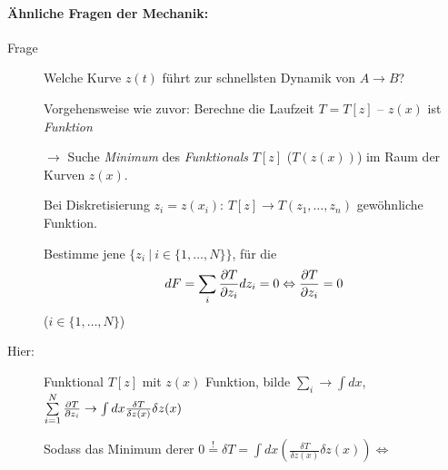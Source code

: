 \paragraph{Ähnliche Fragen der Mechanik:}
\begin{description}

\item[Frage] Welche Kurve $z(t)$ führt zur schnellsten Dynamik von
  $A \rightarrow B$?

  \skizze{}

  Vorgehensweise wie zuvor: Berechne die Laufzeit $T = T[z]$ -- $z(x)$
  ist \emph{Funktion}

  \skizze{}

  $\rightarrow$ Suche \emph{Minimum} des \emph{Funktionals} $T[z]$
  ($T(z(x))$) im Raum der Kurven $z(x)$.

  Bei Diskretisierung $z_i = z(x_i)$:
  $T[z] \rightarrow T (z_1, \dots, z_n)$ gewöhnliche Funktion.

  Bestimme jene
  $\lbrace z_i \:|\: i\in \lbrace 1, \dots, N \rbrace \rbrace$, für
  die
  $$dF = \sum\limits_i \frac{\partial T}{\partial z_i} dz_i = 0 \Leftrightarrow
  \frac{\partial T}{\partial z_i} = 0 $$ ($i \in \lbrace 1, \dots, N \rbrace$)

\item[Hier:] Funktional $T[z]$ mit $z(x)$ Funktion, bilde
  $\sum\limits_i \rightarrow \int dx$,
  $\sum\limits_{i=1}^N \frac{\partial T}{\partial z_i} \rightarrow \int dx \frac{\delta
    T}{\delta z(x)} \delta z(x)$ %

  Sodass das Minimum derer
  $0 \stackrel{!}{=} \delta T = \int dx \left( \frac{\delta T}{\delta
      z(x)} \delta z(x) \right) \Leftrightarrow$


\end{description}


